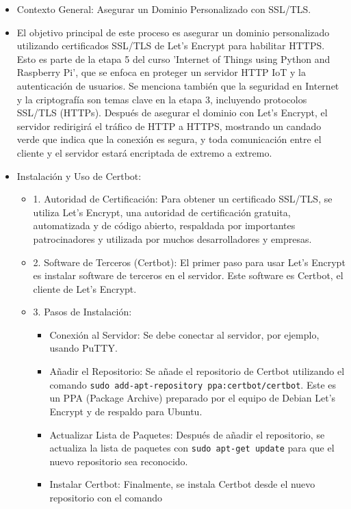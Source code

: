 \documentclass{report}
\begin{document}
\begin{itemize}
    \item Contexto General: Asegurar un Dominio Personalizado con SSL/TLS.
    \item El objetivo principal de este proceso es asegurar un dominio personalizado utilizando certificados SSL/TLS de Let's Encrypt 
    para habilitar HTTPS. Esto es parte de la etapa 5 del curso 'Internet of Things using Python and Raspberry Pi', que se enfoca en proteger 
    un servidor HTTP IoT y la autenticación de usuarios. Se menciona también que la seguridad en Internet y la criptografía son temas 
    clave en la etapa 3, incluyendo protocolos SSL/TLS (HTTPs). Después de asegurar el dominio con Let's Encrypt, el servidor redirigirá el 
    tráfico de HTTP a HTTPS, mostrando un candado verde que indica que la conexión es segura, y toda comunicación entre el cliente y el servidor 
    estará encriptada de extremo a extremo.
    \item Instalación y Uso de Certbot:
    \begin{itemize}
        \item 1. Autoridad de Certificación: Para obtener un certificado SSL/TLS, se utiliza Let's Encrypt, una autoridad de certificación 
        gratuita, automatizada y de código abierto, respaldada por importantes patrocinadores y utilizada por muchos desarrolladores y empresas.
        \item 2. Software de Terceros (Certbot): El primer paso para usar Let's Encrypt es instalar software de terceros en el servidor. 
        Este software es Certbot, el cliente de Let's Encrypt.
        \item 3. Pasos de Instalación:
        \begin{itemize}
            \item Conexión al Servidor: Se debe conectar al servidor, por ejemplo, usando PuTTY.
            \item Añadir el Repositorio: Se añade el repositorio de Certbot utilizando el comando \verb|sudo add-apt-repository ppa:certbot/certbot|. 
            Este es un PPA (Package Archive) preparado por el equipo de Debian Let's Encrypt y de respaldo para Ubuntu.
            \item Actualizar Lista de Paquetes: Después de añadir el repositorio, se actualiza la lista de paquetes con \verb|sudo apt-get update| 
            para que el nuevo repositorio sea reconocido.
            \item Instalar Certbot: Finalmente, se instala Certbot desde el nuevo repositorio con el comando 

\end{itemize}
\end{itemize}
\end{itemize}
\end{document}
